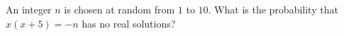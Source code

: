 An integer $n$ is chosen at random from $1$ to $10$. What is the probability that $x(x+5)=-n$ has no real solutions?
